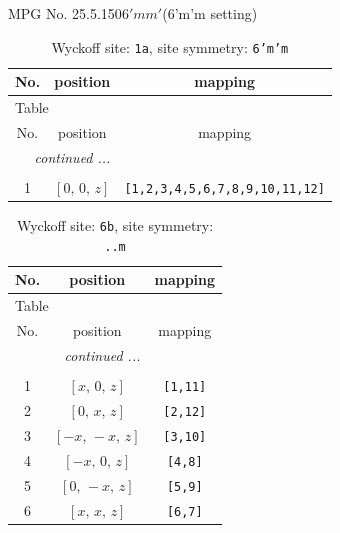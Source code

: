 \documentclass[fleqn,8pt]{jsarticle}
\begin{document}
\setcounter{MaxMatrixCols}{32}

\renewcommand{\tablename}{Table~}
\renewcommand{\figurename}{Figure~}
\begin{center}
\LARGE
MPG No. 25.5.150\quad$6'mm'$\quad(6'm'm setting)
\end{center}
\renewcommand{\arraystretch}{1.2}
\begin{longtable}{ccc}
\caption{Wyckoff site: {\tt 1a}, site symmetry: {\tt 6'm'm}}
 \\
 \hline \hline
No. & position & mapping \\ \hline \endfirsthead

\multicolumn{2}{l}{\tablename\ \thetable{}} \\
 \hline \hline
No. & position & mapping \\ \hline \endhead

 \hline \hline
\multicolumn{2}{r}{\footnotesize\it continued ...} \\ \endfoot

 \hline \hline
\multicolumn{2}{r}{} \\ \endlastfoot

1 & $\left[ 0,\, 0,\, z \right]$ & {\tt [1,2,3,4,5,6,7,8,9,10,11,12]} \\
\end{longtable}
\renewcommand{\arraystretch}{1.2}
\begin{longtable}{ccc}
\caption{Wyckoff site: {\tt 6b}, site symmetry: {\tt ..m}}
 \\
 \hline \hline
No. & position & mapping \\ \hline \endfirsthead

\multicolumn{2}{l}{\tablename\ \thetable{}} \\
 \hline \hline
No. & position & mapping \\ \hline \endhead

 \hline \hline
\multicolumn{2}{r}{\footnotesize\it continued ...} \\ \endfoot

 \hline \hline
\multicolumn{2}{r}{} \\ \endlastfoot

1 & $\left[ x,\, 0,\, z \right]$ & {\tt [1,11]} \\ \hline
2 & $\left[ 0,\, x,\, z \right]$ & {\tt [2,12]} \\ \hline
3 & $\left[ - x,\, - x,\, z \right]$ & {\tt [3,10]} \\ \hline
4 & $\left[ - x,\, 0,\, z \right]$ & {\tt [4,8]} \\ \hline
5 & $\left[ 0,\, - x,\, z \right]$ & {\tt [5,9]} \\ \hline
6 & $\left[ x,\, x,\, z \right]$ & {\tt [6,7]} \\
\end{longtable}
\end{document}
